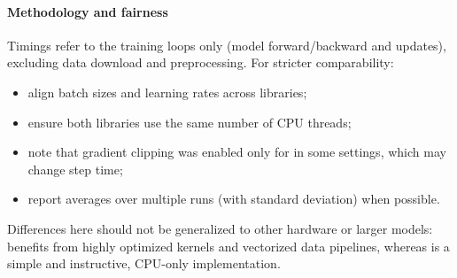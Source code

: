 \paragraph{Methodology and fairness}
Timings refer to the training loops only (model forward/backward and updates), excluding data download and preprocessing. For stricter comparability:
\begin{itemize}
    \item align batch sizes and learning rates across libraries;
    \item ensure both libraries use the same number of CPU threads;
    \item note that gradient clipping was enabled only for \mfnet in some settings, which may change step time;
    \item report averages over multiple runs (with standard deviation) when possible.
\end{itemize}

Differences here should not be generalized to other hardware or larger models: \pytorch benefits from highly optimized kernels and vectorized data pipelines, whereas \mfnet is a simple and instructive, CPU-only implementation.
